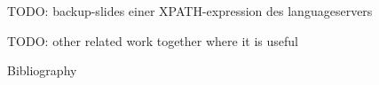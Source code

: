 


\titleframe

% 

% 

% 





\begin{frame}
   TODO: backup-slides einer XPATH-expression des languageservers
\end{frame}
\begin{frame}
TODO: other related work together where it is useful
\end{frame}




\begin{frame}{Bibliography}
   \printBibCommand
\end{frame}

